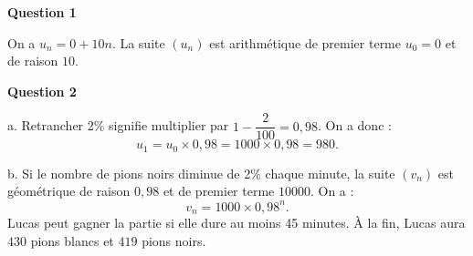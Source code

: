 \textbf{Question 1}
	
	On a $u_n = 0 + 10n$. La suite $(u_n)$ est arithmétique de premier terme $u_0 = 0$ et de raison $10$.
	
	\textbf{Question 2}
	
	a. Retrancher 2\% signifie multiplier par $1 - \dfrac{2}{100} = 0,98$. On a donc :
	\[
	u_1 = u_0 \times 0,98 = 1000 \times 0,98 = 980.
	\]
	
	b. Si le nombre de pions noirs diminue de 2\% chaque minute, la suite $(v_n)$ est géométrique de raison $0,98$ et de premier terme $10 000$. On a :
	\[
	v_n = 1000 \times 0,98^n.
	\]
	Lucas peut gagner la partie si elle dure au moins 45 minutes. À la fin, Lucas aura $430$ pions blancs et $419$ pions noirs.
